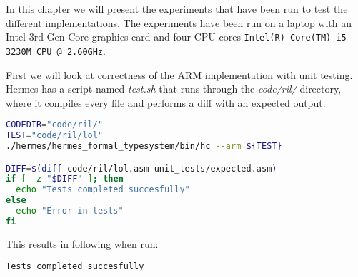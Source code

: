 In this chapter we will present the experiments that have been run to test the different implementations.
The experiments have been run on a laptop with an Intel 3rd Gen Core graphics card and four CPU cores \lstinline{Intel(R) Core(TM) i5-3230M CPU @ 2.60GHz}.

First we will look at correctness of the ARM implementation with unit testing.
Hermes has a script named \emph{test.sh} that runs through the \emph{code/ril/} directory, where it compiles every file and performs a diff with an expected output.

\begin{lstlisting}[language=bash, float=htp]
CODEDIR="code/ril/"
TEST="code/ril/lol"
./hermes/hermes_formal_typesystem/bin/hc --arm ${TEST}

DIFF=$(diff code/ril/lol.asm unit_tests/expected.asm)
if [ -z "$DIFF" ]; then
  echo "Tests completed succesfully"
else
  echo "Error in tests"
fi
\end{lstlisting}
This results in following when run:
\begin{lstlisting}[float=htp]
Tests completed succesfully
\end{lstlisting}

